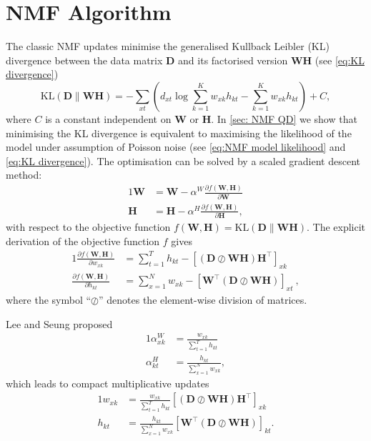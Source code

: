 \chapter{NMF Algorithm\label{app:NMF-algorithm}}

The classic NMF updates \cite{Lee2001} minimise the generalised Kullback \textendash{} Leibler (KL) divergence between the data matrix $\bm{D}$ and its factorised version $\bm{WH}$ (see \autoref{eq:KL divergence})
%
\begin{equation}
	\mbox{KL}(\bm{D}\parallel\bm{WH})=-\sum_{xt}\left(d_{xt}\log\sum_{k=1}^Kw_{xk}h_{kt}-\sum_{k=1}^Kw_{xk}h_{kt}\right)+C,
	\label{app-eq:KL}
\end{equation}
where $C$ is a constant independent on $\bm{W}$ or $\bm{H}$. In \autoref{sec: NMF QD} we show that minimising the KL divergence is equivalent to maximising the likelihood of the model under assumption of Poisson noise (see \autoref{eq:NMF model likelihood} and \autoref{eq:KL divergence}). The optimisation can be solved by a scaled gradient descent method:
%
\begin{alignat}{1}
	\bm{W} & =\bm{W}-\alpha^{W}\frac{\partial f(\bm{W,H})}{\partial \bm{W}}\nonumber \\
	\bm{H} & =\bm{H}-\alpha^{H}\frac{\partial f(\bm{W,H})}{\partial \bm{H}},
	\label{eq:gradient descend}
\end{alignat}
%
with respect to the objective function $f(\bm{W,H})=\mbox{KL}(\bm{D}\parallel\bm{WH})$. The explicit derivation of the objective function $f$ gives
%
\begin{alignat}{1}
	\frac{\partial f(\bm{W,H})}{\partial w_{xk}} & =\sum_{t=1}^T h_{kt}-\left[(\bm{D}\oslash\bm{WH})\bm{H}^{\top}\right]_{xk}\nonumber \\
	\frac{\partial f(\bm{W,H})}{\partial h_{kt}} & =\sum_{x=1}^N w_{xk}-\left[\bm{W^{\top}}(\bm{D}\oslash\bm{WH})\right]_{xt}\ ,
	\label{eq:gradients}
\end{alignat}
%
where the symbol ``$\oslash$'' denotes the element-wise division of matrices. 

Lee and Seung \cite{Lee2001} proposed 
%
\begin{alignat}{1}
	\alpha_{xk}^{W} & =\frac{w_{xk}}{\sum_{t=1}^Th_{kt}}\nonumber \\
	\alpha_{kt}^{H} & =\frac{h_{kt}}{\sum_{x=1}^Nw_{xk}},
	\label{eq:alphas}
\end{alignat}
%
which leads to compact multiplicative updates
%
\begin{alignat}{1}
	w_{xk} & =\frac{w_{xk}}{\sum_{t=1}^Th_{kt}}\left[(\bm{D}\oslash\bm{WH})\bm{H^{\top}}\right]_{xk}\nonumber \\
	h_{kt} & =\frac{h_{kt}}{\sum_{x=1}^Nw_{xk}}\left[\bm{W^{\top}}(\bm{D}\oslash\bm{WH})\right]_{kt}.
	\label{eq:classic updates}
\end{alignat}
%

